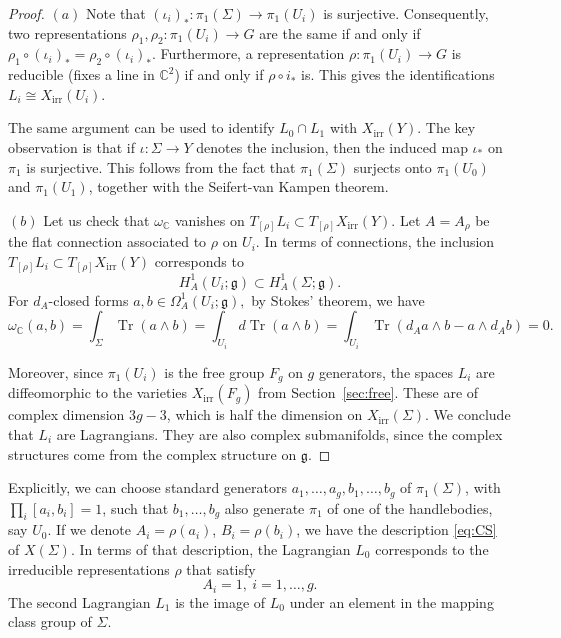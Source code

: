 \documentclass [11pt]{amsart}
\theoremstyle{remark}
\def\cc {{\mathbb{C}}}
\def\C{\cc}
\def\g{\mathfrak{g}}
\def\Char {X}
\def\CharIrr {\Char_{\operatorname{irr}}}
\def\tr {\operatorname{Tr }}
\def\omegac{\omega_{\C}}
\begin{document}
\begin{proof}
$(a)$ Note that $(\iota_i)_*: \pi_1(\Sigma) \to \pi_1(U_i)$ is surjective. Consequently, two representations $\rho_1, \rho_2: \pi_1(U_i) \to G$ are the same if and only if $\rho_1 \circ (\iota_i)_*= \rho_2\circ (\iota_i)_*.$ Furthermore, a representation $\rho: \pi_1(U_i) \to G$ is reducible (fixes a line in $\C^2$) if and only if $\rho \circ i_*$ is. This gives the identifications $L_i \cong \CharIrr(U_i)$. 

The same argument can be used to identify $L_0 \cap L_1$ with $\CharIrr(Y)$. The key observation is that if $\iota: \Sigma \to Y$ denotes the inclusion, then the induced map $\iota_*$ on $\pi_1$ is surjective. This follows from the fact that $\pi_1(\Sigma)$ surjects onto $\pi_1(U_0)$ and $\pi_1(U_1)$, together with the Seifert-van Kampen theorem.

$(b)$ Let us check that $\omegac$ vanishes on $T_{[\rho]}L_i \subset T_{[\rho]}\CharIrr(Y)$. Let $A = A_{\rho}$ be the flat connection associated to $\rho$ on $U_i$. In terms of connections, the inclusion 
$T_{[\rho]}L_i \subset T_{[\rho]}\CharIrr(Y)$ corresponds to
$$ H^1_A(U_i; \g) \subset H^1_A(\Sigma; \g).$$
For $d_A$-closed forms $a, b \in \Omega^1_A(U_i; \g),$ by Stokes' theorem, we have
$$ \omegac(a, b) = \int_\Sigma \tr(a \wedge b) = \int_{U_i} d\tr(a \wedge b) = \int_{U_i} \tr(d_A a \wedge b - a \wedge d_A b) = 0.$$

Moreover, since $\pi_1(U_i)$ is the free group $F_g$ on $g$ generators, the spaces $L_i$ are diffeomorphic to the varieties $\CharIrr(F_g)$ from Section~\ref{sec:free}. These are of complex dimension $3g-3$, which is half the dimension on $\CharIrr(\Sigma)$. We conclude that $L_i$ are Lagrangians. They are also complex submanifolds, since the complex structures come from the complex structure on $\g$.
\end{proof}

Explicitly, we can choose standard generators $a_1, \dots, a_g, b_1, \dots, b_g$ of $\pi_1(\Sigma)$, with $\prod_i [a_i, b_i]=1$, such that $b_1, \dots, b_g$ also generate $\pi_1$ of one of the handlebodies, say $U_0$. If we denote $A_i=\rho(a_i)$, $B_i=\rho(b_i)$, we have the description \eqref{eq:CS} of $\Char(\Sigma)$. In terms of that description, the Lagrangian $L_0$ corresponds to the irreducible representations $\rho$ that satisfy
$$ A_i =1, \ i=1, \dots, g.$$
The second Lagrangian $L_1$ is the image of $L_0$ under an element in the mapping class group of $\Sigma$. 
\end{document}
